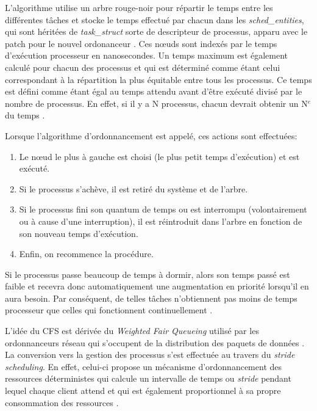 \documentclass[letterpaper]{article}
\begin{document}
L'algorithme utilise un arbre rouge-noir pour répartir le temps entre les différentes tâches et stocke le temps effectué par chacun dans les \textit{sched\_entities}, qui sont héritées de \textit{task\_struct} sorte de descripteur de processus, apparu avec le patch pour le nouvel ordonanceur \citep{Pabla:2009:CFS:1594371.1594375}. Ces nœuds sont indexés par le temps d'exécution processeur en nanosecondes. Un temps maximum est également calculé pour chacun des processus et qui est déterminé comme étant celui correspondant à la répartition la plus équitable entre tous les processus. Ce temps est défini comme étant égal au temps attendu avant d'être exécuté divisé par le nombre de processus. En effet, si il y a N processus, chacun devrait obtenir un N$^{e}$ du temps \citep{IllustrationCFSusingAATree}.

Lorsque l'algorithme d'ordonnancement est appelé, ces actions sont effectuées:

\begin{enumerate}
\item Le nœud le plus à gauche est choisi (le plus petit temps d'exécution) et est exécuté.
\item Si le processus s'achève, il est retiré du système et de l'arbre.
\item Si le processus fini son quantum de temps ou est interrompu (volontairement ou à cause d'une interruption), il est réintroduit dans l'arbre en fonction de son nouveau temps d'exécution.
\item Enfin, on recommence la procédure.
\end{enumerate}

Si le processus passe beaucoup de temps à dormir, alors son temps passé est faible et recevra donc automatiquement une augmentation en priorité lorsqu'il en aura besoin. Par conséquent, de telles tâches n'obtiennent pas moins de temps processeur que celles qui fonctionnent continuellement \citep{Wong:2008:TAF:1400097.1400102}.

L'idée du CFS est dérivée du \textit{Weighted Fair Queueing} utilisé par les ordonnanceurs réseau qui s'occupent de la distribution des paquets de données \citep{Demers:1989:ASF:75247.75248}. La conversion vers la gestion des processus s'est effectuée au travers du \textit{stride scheduling}. En effet, celui-ci propose un mécanisme d'ordonnancement des ressources déterministes qui calcule un intervalle de temps ou \textit{stride} pendant lequel chaque client attend et qui est également proportionnel à sa propre consommation des ressources \citep{Waldspurger:1995:LSS:888601}.
\end{document}
